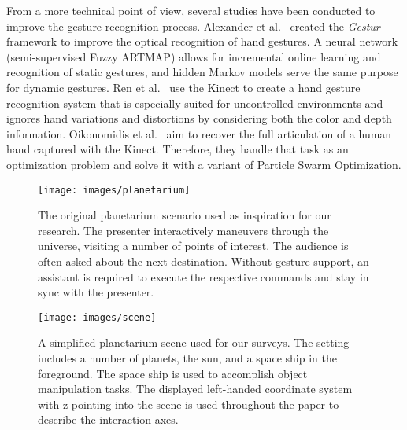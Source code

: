 \documentclass{sigchi}
\begin{document}
From a more technical point of view, several studies have been conducted to improve the gesture recognition process. Alexander et al.~\cite{Alexander2009} created the \textit{Gestur} framework to improve the optical recognition of hand gestures. A neural network (semi-supervised Fuzzy ARTMAP) allows for incremental online learning and recognition of static gestures, and hidden Markov models serve the same purpose for dynamic gestures. Ren et al.~\cite{Ren2011} use the Kinect to create a hand gesture recognition system that is especially suited for uncontrolled environments and ignores hand variations and distortions by considering both the color and depth information. Oikonomidis et al.~\cite{3D-Tracking} aim to recover the full articulation of a human hand captured with the Kinect. Therefore, they handle that task as an optimization problem and solve it with a variant of Particle Swarm Optimization.

\begin{figure}[t]
\centering
\texttt{[image: images/planetarium]}
\vskip-1mm
\caption{The original planetarium scenario used as inspiration for our research. The presenter interactively maneuvers through the universe, visiting a number of points of interest. The audience is often asked about the next destination. Without gesture support, an assistant is required to execute the respective commands and stay in sync with the presenter.}
\label{fig:dome}
\end{figure}

\begin{figure}[t]
\centering
\texttt{[image: images/scene]}
\vskip-1mm
\caption{A simplified planetarium scene used for our surveys. The setting includes a number of planets, the sun, and a space ship in the foreground. The space ship is used to accomplish object manipulation tasks. The displayed left-handed coordinate system with z pointing into the scene is used throughout the paper to describe the interaction axes.}
\label{fig:scene}
\end{figure}




\end{document}
